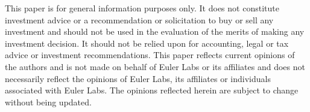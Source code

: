 \documentclass{article}
\begin{document}
This paper is for general information purposes only. It does not constitute investment
advice or a recommendation or solicitation to buy or sell any investment and should not
be used in the evaluation of the merits of making any investment decision. It should not
be relied upon for accounting, legal or tax advice or investment recommendations. This
paper reflects current opinions of the authors and is not made on behalf of Euler Labs or its
affiliates and does not necessarily reflect the opinions of Euler Labs, its affiliates or individuals
associated with Euler Labs. The opinions reflected herein are subject to change without being
updated.
\end{document}
